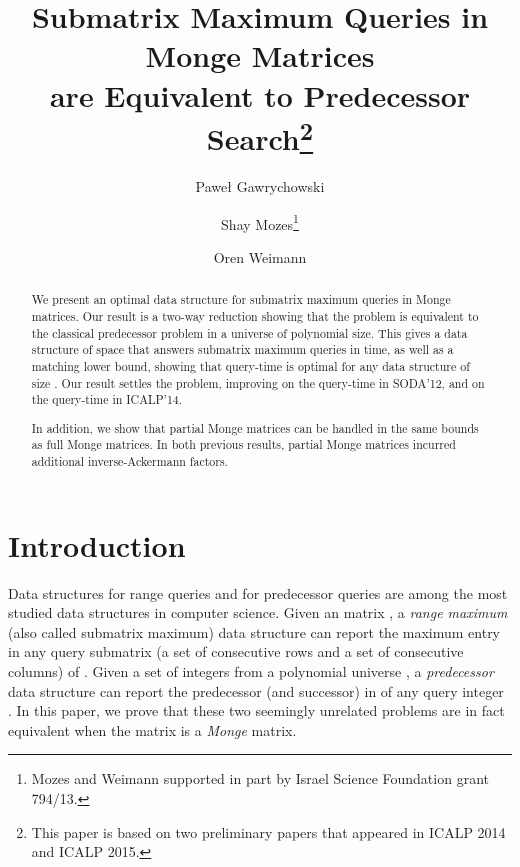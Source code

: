 \documentclass{llncs}
\begin{document}
\title{Submatrix Maximum Queries in Monge Matrices\\ are
Equivalent to Predecessor Search\thanks{This paper is based on two preliminary papers that appeared in ICALP 2014 and ICALP 2015.}}

\author{
Pawe{\l} Gawrychowski \and Shay Mozes\thanks{Mozes and Weimann supported in part by
  Israel Science Foundation grant 794/13.} \and Oren Weimann
}


\date{}
\maketitle

\begin{abstract}
We present an optimal data structure for submatrix maximum
queries in  Monge matrices.
Our result is a two-way reduction showing that the problem is
equivalent to the classical predecessor problem in a universe of polynomial size. This gives a data
structure of  space that answers submatrix maximum queries in
 time, as well as a matching lower bound, showing that  query-time is optimal for any data structure
of size . 
Our result settles the problem, improving on the 
query-time in SODA'12, and on the  query-time in ICALP'14. 

In addition, we show that partial Monge matrices can be handled in the same bounds as full Monge matrices. In both previous results, partial Monge matrices incurred additional inverse-Ackermann factors.
\end{abstract}


 
\section{Introduction}
Data structures for range queries and for predecessor queries are
among the most studied data structures in computer science. Given an
 matrix ,  a {\em range maximum} (also called submatrix
maximum) data structure can report the maximum entry in any query
submatrix (a set of consecutive rows and a set of consecutive columns)
of . Given a set  of  integers from a
polynomial universe , 
a {\em predecessor} data structure can report the predecessor (and successor) in  of any query integer . 
In this paper, we prove that these two seemingly unrelated problems are in fact equivalent when the matrix  is a {\em Monge} matrix.
\end{document}
